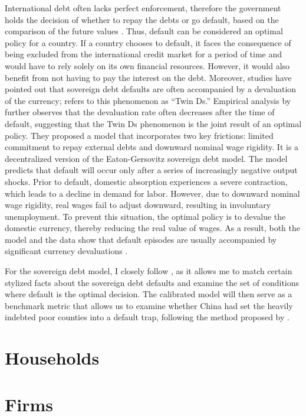 International debt often lacks perfect enforcement, therefore the government holds the decision of whether to repay the debts or go default, based on the comparison of the future values \citep*{Eaton-Gersovitz-81}. Thus, default can be considered an optimal policy for a country.
If a country chooses to default, it faces the consequence of being excluded from the international credit market for a period of time and  would have to rely solely on its own financial resources. However, it would also benefit from not having to pay the interest on the debt.
Moreover, studies have pointed out that sovereign debt defaults are often accompanied by a devaluation of the currency; \citet*{Reinhart02} refers to this phenomenon as ``Twin Ds.''
Empirical analysis by \citet*{Na-18} further observes that the devaluation rate often decreases after the time of default, suggesting that the Twin Ds phenomenon is the joint result of an optimal policy.
They proposed a model that incorporates two key frictions: limited commitment to repay external debts and downward nominal wage rigidity.
It is a decentralized version of the Eaton-Gersovitz sovereign debt model.
The model predicts that default will occur only after a series of increasingly negative output shocks. Prior to default, domestic absorption experiences a severe contraction, which leads to a decline in demand for labor. However, due to downward nominal wage rigidity, real wages fail to adjust downward, resulting in involuntary unemployment. To prevent this situation, the optimal policy is to devalue the domestic currency, thereby reducing the real value of wages. As a result, both the model and the data show that default episodes are usually accompanied by significant currency devaluations \citep*{Na-18}.

For the sovereign debt model, I closely follow \citet*{Na-18}, as it allows me to match certain stylized facts about the sovereign debt defaults and examine the set of conditions where default is the optimal decision.
The calibrated model will then serve as a benchmark metric that allows us to examine whether China had set the heavily indebted poor counties into a default trap, following the method proposed by \citet*{Hinrichsen_2020-chapter4}.

\section{Households}


\section{Firms}


